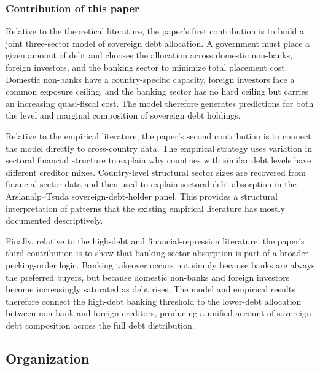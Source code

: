\documentclass[\latexroot/\projectname]{subfiles}
\begin{document}
\subsubsection{Contribution of this paper}
\whenintegrated{\label{lit-contribution}}

Relative to the theoretical literature, the paper's first contribution is to build a joint three-sector model of sovereign debt allocation.
A government must place a given amount of debt and chooses the allocation across domestic non-banks, foreign investors, and the banking sector to minimize total placement cost.
Domestic non-banks have a country-specific capacity, foreign investors face a common exposure ceiling, and the banking sector has no hard ceiling but carries an increasing quasi-fiscal cost.
The model therefore generates predictions for both the level and marginal composition of sovereign debt holdings.

Relative to the empirical literature, the paper's second contribution is to connect the model directly to cross-country data.
The empirical strategy uses variation in sectoral financial structure to explain why countries with similar debt levels have different creditor mixes.
Country-level structural sector sizes are recovered from financial-sector data and then used to explain sectoral debt absorption in the Arslanalp--Tsuda sovereign-debt-holder panel.
This provides a structural interpretation of patterns that the existing empirical literature has mostly documented descriptively.

Finally, relative to the high-debt and financial-repression literature, the paper's third contribution is to show that banking-sector absorption is part of a broader pecking-order logic.
Banking takeover occurs not simply because banks are always the preferred buyers, but because domestic non-banks and foreign investors become increasingly saturated as debt rises.
The model and empirical results therefore connect the high-debt banking threshold to the lower-debt allocation between non-bank and foreign creditors, producing a unified account of sovereign debt composition across the full debt distribution.

\whenintegrated{\label{organization}}\par\subsection{Organization}
\whenintegrated{\label{sec:org}} %
\end{document}
